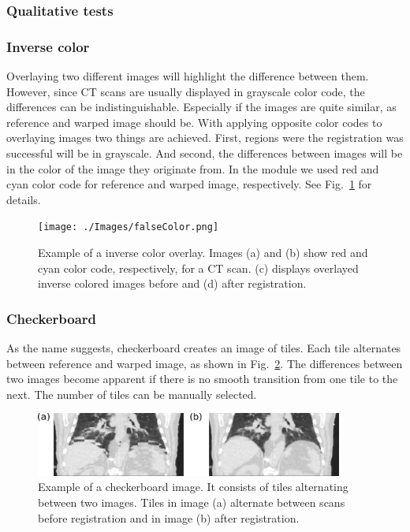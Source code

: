 \documentclass[type=dr, dr=rernat, accentcolor=tud7b,colorbacktitle, bigchapter, openright, twoside, 12pt ]{tudthesis}
\begin{document}
\subsubsection{Qualitative tests}

\subsubsection{Inverse color}


Overlaying two different images will highlight the difference between them. However, since CT scans are usually displayed in grayscale color code, the differences can be indistinguishable. Especially if the images are quite similar, as reference and warped image should be. With applying opposite color codes to overlaying images two things are achieved. First, regions were the registration was successful will be in grayscale. And second, the differences between images will be in the color of the image they originate from. In the module we used red and cyan color code for reference and warped image, respectively. See Fig.~\ref{falseColor} for details.

\newpage
\begin{figure}[H]
	\begin{center}		
		\texttt{[image: ./Images/falseColor.png]}
		\caption{Example of a inverse color overlay. Images (a) and (b) show red and cyan color code, respectively, for a CT scan. (c) displays overlayed inverse colored images before and (d) after registration.}
		\label{falseColor}
	\end{center}
\end{figure}

\subsubsection{Checkerboard}

As the name suggests, checkerboard creates an image of tiles. Each tile alternates between reference and warped image, as shown in Fig.~\ref{checkerboard}. The differences between two images become apparent if there is no smooth transition from one tile to the next. 
The number of tiles can be manually selected.

\begin{figure}[H]
	\begin{center}		
		\includegraphics[width=0.9\textwidth]{./Images/checkerboard.png}
		\caption{Example of a checkerboard image. It consists of tiles alternating between two images. Tiles in image (a) alternate between scans before registration and in image (b) after registration.}
		\label{checkerboard}
	\end{center}
\end{figure}
\end{document}
